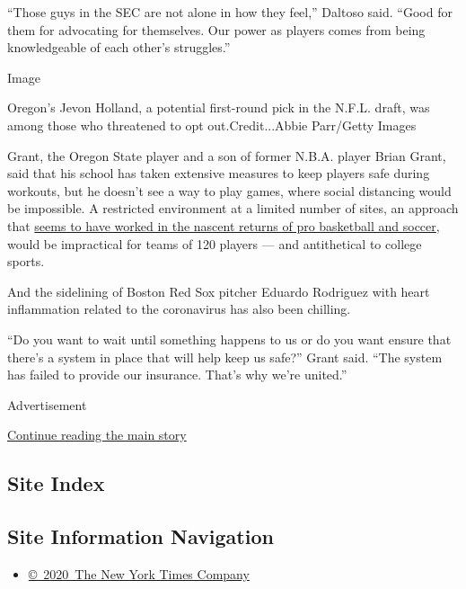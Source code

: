 ``Those guys in the SEC are not alone in how they feel,'' Daltoso said.
``Good for them for advocating for themselves. Our power as players
comes from being knowledgeable of each other's struggles.''

Image

Oregon's Jevon Holland, a potential first-round pick in the N.F.L.
draft, was among those who threatened to opt out.Credit...Abbie
Parr/Getty Images

Grant, the Oregon State player and a son of former N.B.A. player Brian
Grant, said that his school has taken extensive measures to keep players
safe during workouts, but he doesn't see a way to play games, where
social distancing would be impossible. A restricted environment at a
limited number of sites, an approach that
\href{https://www.nytimes.com/2020/07/30/sports/basketball/sports-bubble-nba-mlb.html}{seems
to have worked in the nascent returns of pro basketball and soccer},
would be impractical for teams of 120 players --- and antithetical to
college sports.

And the sidelining of Boston Red Sox pitcher Eduardo Rodriguez with
heart inflammation related to the coronavirus has also been chilling.

``Do you want to wait until something happens to us or do you want
ensure that there's a system in place that will help keep us safe?''
Grant said. ``The system has failed to provide our insurance. That's why
we're united.''

Advertisement

\protect\hyperlink{after-bottom}{Continue reading the main story}

\hypertarget{site-index}{%
\subsection{Site Index}\label{site-index}}

\hypertarget{site-information-navigation}{%
\subsection{Site Information
Navigation}\label{site-information-navigation}}

\begin{itemize}
\tightlist
\item
  \href{https://help.nytimes.com/hc/en-us/articles/115014792127-Copyright-notice}{©~2020~The
  New York Times Company}
\end{itemize}

